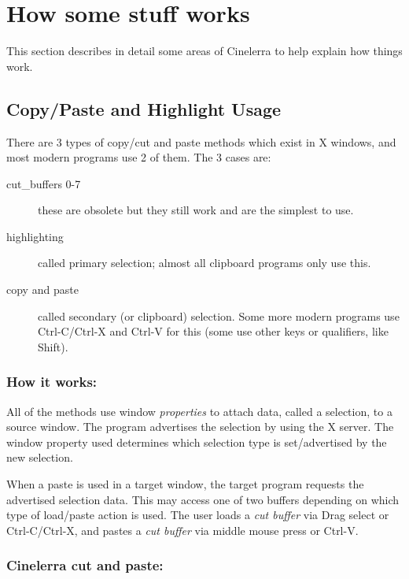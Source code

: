 \chapter{How some stuff works}%
\label{cha:how_stuff_works}

This section describes in detail some areas of Cinelerra to help explain how things work.

\section{Copy/Paste and Highlight Usage}%
\label{sec:copy_paste_highlight_usage}

There are 3 types of copy/cut and paste methods which exist in X windows, and most modern programs use 2 of them.  The 3 cases are:

\begin{description}
    \item[cut\_buffers 0-7] these are obsolete but they still work and are the simplest to use.
    \item[highlighting] called primary selection; almost all clipboard programs only use this.
    \item[copy and paste] called secondary (or clipboard) selection. Some more modern programs use Ctrl-C/Ctrl-X and Ctrl-V for this (some use other keys or qualifiers, like Shift).
\end{description}

\subsection*{How it works:}%
\label{sub:how_it_works}

All of the methods use window \textit{properties} to attach data, called a selection, to a source window.  The program advertises the selection by using the X server.  The window property used determines which selection type is set/advertised by the new selection.

When a paste is used in a target window, the target program requests the advertised selection data.  This may access one of two buffers depending on which type of load/paste action is used.  The user loads a \textit{cut buffer} via Drag select or Ctrl-C/Ctrl-X, and pastes a \textit{cut buffer} via middle mouse press or Ctrl-V.

\subsection*{Cinelerra cut and paste:}%
\label{sub:cinelerra_cut_paste}

